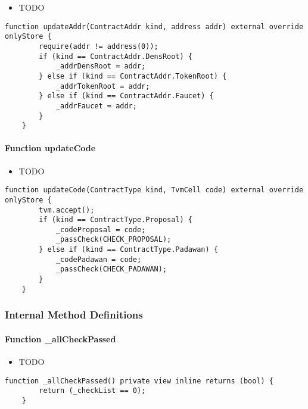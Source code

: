 \begin{itemize}
\item TODO
\end{itemize}

\begin{lstlisting}[firstnumber=174]
    function updateAddr(ContractAddr kind, address addr) external override onlyStore {
        require(addr != address(0));
        if (kind == ContractAddr.DensRoot) {
            _addrDensRoot = addr;
        } else if (kind == ContractAddr.TokenRoot) {
            _addrTokenRoot = addr;
        } else if (kind == ContractAddr.Faucet) {
            _addrFaucet = addr;
        }
    }
\end{lstlisting}

\paragraph{Function updateCode}

\begin{itemize}
\item TODO
\end{itemize}

\begin{lstlisting}[firstnumber=185]
    function updateCode(ContractType kind, TvmCell code) external override onlyStore {
        tvm.accept();
        if (kind == ContractType.Proposal) {
            _codeProposal = code;
            _passCheck(CHECK_PROPOSAL);
        } else if (kind == ContractType.Padawan) {
            _codePadawan = code;
            _passCheck(CHECK_PADAWAN);
        }
    }
\end{lstlisting}

\subsubsection{Internal Method Definitions}


\paragraph{Function \_{}allCheckPassed}

\begin{itemize}
\item TODO
\end{itemize}

\begin{lstlisting}[firstnumber=62]
    function _allCheckPassed() private view inline returns (bool) {
        return (_checkList == 0);
    }
\end{lstlisting}

